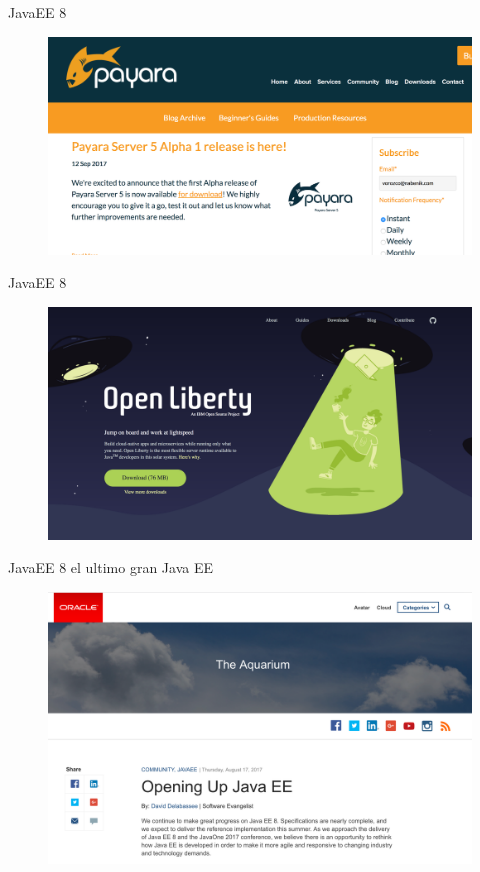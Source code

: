 \documentclass{beamer}
\begin{document}
\begin{frame}{JavaEE 8}
\begin{figure}
	\centering
	\includegraphics[width=\linewidth]{Images/payara5}
\end{figure}
\end{frame}


\begin{frame}{JavaEE 8}
\begin{figure}
	\centering
	\includegraphics[width=\linewidth]{Images/liberty}
\end{figure}
\end{frame}


\begin{frame}{JavaEE 8 el ultimo gran Java EE}
\begin{figure}
	\centering
	\includegraphics[width=\linewidth]{Images/javaeeopen}
\end{figure}
\end{frame}
\end{document}
